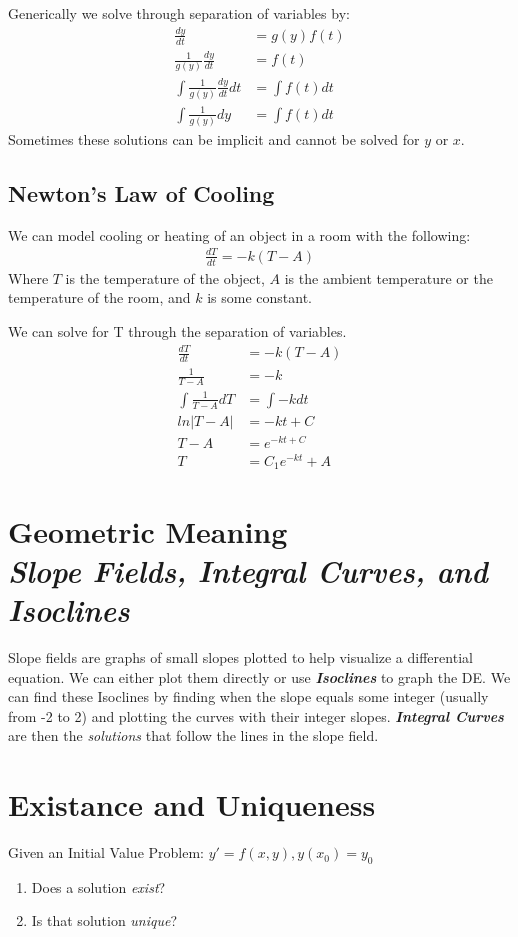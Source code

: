 Generically we solve through separation of variables by:
\begin{align*}
    \frac{dy}{dt} & = g(y)f(t) \\
    \frac{1}{g(y)} \frac{dy}{dt} & = f(t) \\ 
    \int \frac{1}{g(y)} \frac{dy}{dt} dt & = \int f(t) dt \\
    \int \frac{1}{g(y)} dy & = \int f(t) dt
\end{align*}
Sometimes these solutions can be implicit and cannot be solved for $y$ or $x$.

\subsection{Newton's Law of Cooling}
We can model cooling or heating of an object in a room with the following:
\begin{align*}
    \frac{dT}{dt} = -k (T-A)
\end{align*}
Where $T$ is the temperature of the object, $A$ is the ambient temperature or the temperature of the room, and $k$ is some constant. \par
We can solve for T through the separation of variables.
\begin{align*}
    \frac{dT}{dt} & = -k (T-A) \\
    \frac{1}{T-A} & = -k \\
    \int \frac{1}{T-A} dT & = \int -k dt \\
    ln|T-A| & = -kt + C \\
    T - A & = e^{-kt + C} \\
    T & = C_1e^{-kt} + A
\end{align*}

\section{Geometric Meaning \\ \normalsize \normalfont \emph{Slope Fields, Integral Curves, and Isoclines}}

Slope fields are graphs of small slopes plotted to help visualize a differential equation. We can either plot them directly or use \textbf{\emph{Isoclines}} to graph the DE. We can find these Isoclines by finding when the slope equals some integer (usually from -2 to 2) and plotting the curves with their integer slopes.
\textbf{\emph{Integral Curves}} are then the \emph{solutions} that follow the lines in the slope field.

\section{Existance and Uniqueness}
Given an Initial Value Problem: $y' = f(x,y), y(x_0) = y_0$
\begin{enumerate}
    \item Does a solution \emph{exist}?
    \item Is that solution \emph{unique}?
\end{enumerate}

